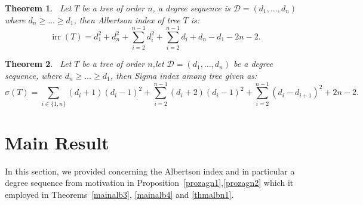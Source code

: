 \documentclass[12pt]{amsart}
\newcommand{\irr}{\operatorname{irr}}
\newtheorem{theorem}{Theorem}[section]
\begin{document}
\begin{theorem}~\label{mainalb2}
    Let  $T$ be a tree of order $n$, a degree sequence is $\mathscr{D}=(d_1,\dots,d_n)$ where $d_n\geqslant \dots \geqslant d_1$, then Albertson index of tree $T$ is: 
    \[
    \irr(T)=d_1^2+d_n^2+\sum_{i=2}^{n-1} d_i^2+\sum_{i=2}^{n-1} d_i+d_n - d_1-2n-2.
    \]
\end{theorem}
\begin{theorem}~\label{thm.sigma}
Let $T$ be a tree of order $n$,let $\mathscr{D}=(d_1,\dots,d_n)$ be a degree sequence, where $d_n\geqslant \dots \geqslant d_1$, then Sigma index among tree given as:
\[
\sigma(T)=\sum_{i\in\{1,n\}}(d_i+1)(d_i-1)^2+\sum_{i=2}^{n-1}(d_i+2)(d_i-1)^2+\sum_{i=2}^{n-1}(d_i-d_{i+1})^2+2n-2.
\]
\end{theorem}
\section{Main Result}\label{sec3}
In this section, we provided concerning the Albertson index and in particular a degree sequence from motivation in Proposition~\ref{prozagn1},\ref{prozagn2} which it employed in Theorems~\ref{mainalb3}, \ref{mainalb4} and \ref{thmalbn1}.


\end{document}
